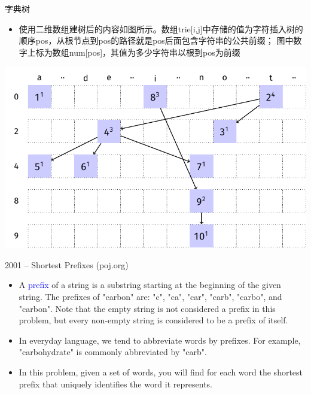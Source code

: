 \begin{frame}{字典树}
    \begin{itemize}
        \item 使用二维数组建树后的内容如图所示。数组trie[i,j]中存储的值为字符插入树的顺序pos，从根节点到pos的路径就是pos后面包含字符串的公共前缀； 图中数字上标为数组num[pos]，其值为多少字符串以根到pos为前缀
    \end{itemize}
    \includegraphics[scale=0.7,center]{fig/6-8.pdf}
\end{frame}
\begin{frame}{2001 -- Shortest Prefixes (poj.org)}
    \begin{itemize}
        \item A \textcolor{blue}{prefix} of a string is a substring starting at the beginning of the given string. The prefixes of "carbon" are: "c", "ca", "car", "carb", "carbo", and "carbon". Note that the empty string is not considered a prefix in this problem, but every non-empty string is considered to be a prefix of itself.
        \item In everyday language, we tend to abbreviate words by prefixes. For example, "carbohydrate" is commonly abbreviated by "carb".
        \item In this problem, given a set of words, you will find for each word the shortest prefix that uniquely identifies the word it represents.
    \end{itemize}
\end{frame}
